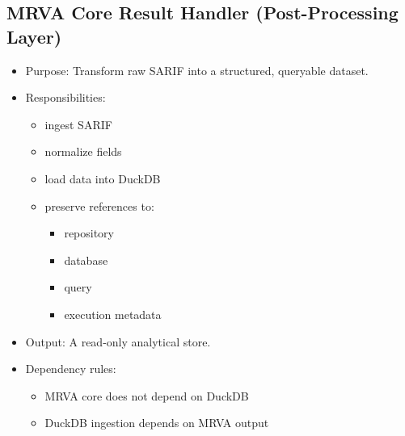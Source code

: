 \documentclass[11pt]{article}
\begin{document}
\subsection{MRVA Core Result Handler (Post-Processing Layer)}
\label{sec:org35c5525}
\begin{itemize}
\item Purpose:
Transform raw SARIF into a structured, queryable dataset.

\item Responsibilities:
\begin{itemize}
\item ingest SARIF
\item normalize fields
\item load data into DuckDB
\item preserve references to:
\begin{itemize}
\item repository
\item database
\item query
\item execution metadata
\end{itemize}
\end{itemize}

\item Output:
A read-only analytical store.

\item Dependency rules:
\begin{itemize}
\item MRVA core does not depend on DuckDB
\item DuckDB ingestion depends on MRVA output
\end{itemize}
\end{itemize}
\end{document}
